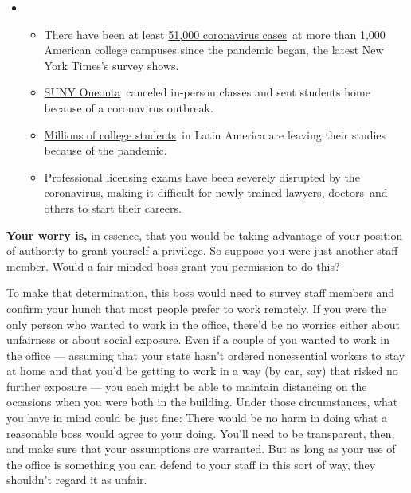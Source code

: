 \begin{itemize}
\item
  \begin{itemize}
  \tightlist
  \item
    There have been at least
    \href{https://www.nytimes3xbfgragh.onion/interactive/2020/us/covid-college-cases-tracker.html?name=styln-coronavirus-schools-reopening\&action=click\&pgtype=Article\&state=default\&region=MAIN_CONTENT_3\&context=storylines_keepup\&region=TOP_BANNER█=storyline_menu_recirc\&action=click\&pgtype=Article\&impression_id=149dfe80-eea3-11ea-aea8-57f827c5e458\&variant=1_Show}{51,000
    coronavirus cases}~at more than 1,000 American college campuses
    since the pandemic began, the latest New York Times's survey shows.
  \item
    \href{https://www.nytimes3xbfgragh.onion/2020/09/03/nyregion/new-york-suny-oneonta-coronavirus.html?action=click\&pgtype=Article\&state=default\&region=MAIN_CONTENT_3\&context=storylines_keepup}{SUNY
    Oneonta}~canceled in-person classes and sent students home because
    of a coronavirus outbreak.
  \item
    \href{https://www.nytimes3xbfgragh.onion/2020/09/04/world/americas/latin-america-education.html?\&action=click\&pgtype=Article\&state=default\&region=MAIN_CONTENT_3\&context=storylines_keepup}{Millions
    of college students}~in Latin America are leaving their studies
    because of the pandemic.
  \item
    Professional licensing exams have been severely disrupted by the
    coronavirus, making it difficult for
    \href{https://www.nytimes3xbfgragh.onion/2020/09/04/us/bar-exam-coronavirus.html?action=click\&pgtype=Article\&state=default\&region=MAIN_CONTENT_3\&context=storylines_keepup}{newly
    trained lawyers, doctors}~and others to start their careers.
  \end{itemize}
\end{itemize}

\textbf{Your worry is,} in essence, that you would be taking advantage
of your position of authority to grant yourself a privilege. So suppose
you were just another staff member. Would a fair-minded boss grant you
permission to do this?

To make that determination, this boss would need to survey staff members
and confirm your hunch that most people prefer to work remotely. If you
were the only person who wanted to work in the office, there'd be no
worries either about unfairness or about social exposure. Even if a
couple of you wanted to work in the office --- assuming that your state
hasn't ordered nonessential workers to stay at home and that you'd be
getting to work in a way (by car, say) that risked no further exposure
--- you each might be able to maintain distancing on the occasions when
you were both in the building. Under those circumstances, what you have
in mind could be just fine: There would be no harm in doing what a
reasonable boss would agree to your doing. You'll need to be
transparent, then, and make sure that your assumptions are warranted.
But as long as your use of the office is something you can defend to
your staff in this sort of way, they shouldn't regard it as unfair.

